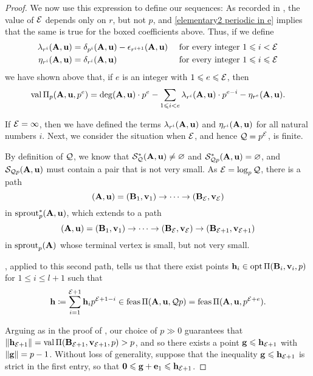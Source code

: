 \documentclass{article}
\begin{document}
\begin{proof}
   We now use this expression to define our sequences:  As recorded in , the value of $\mathcal{E}$ depends only on $r$, but not $p$, and \eqref{elementary2 periodic in e} implies that the same is true for the boxed coefficients above.  Thus, if we define 
   \begin{align*}
   \lambda_{r^i}(\mathbf{A}, \mathbf{u}) & = \delta_{p^i}(\mathbf{A}, \mathbf{u}) - \epsilon_{r^{i+1}}(\mathbf{A}, \mathbf{u}) & \text{ for every integer } 1 \leqslant i  < \mathcal{E} \\ 
   \eta_{r^i}(\mathbf{A}, \mathbf{u}) & = \delta_{r^i}(\mathbf{A}, \mathbf{u}) & \text{ for every integer } 1 \leqslant i \leqslant \mathcal{E}
  \end{align*}   
   we have shown above that, if $e$ is an integer with $1 \leqslant e \leqslant \mathcal{E}$, then
   \begin{equation}
   \label{val-up-to-curly-e-via-two-sequences: e}
   \operatorname{val} \Pi_p(\mathbf{A},\mathbf{u},p^e) = \operatorname{deg}(\mathbf{A}, \mathbf{u}) \cdot p^e - \sum_{1 \leqslant i < e} \lambda_{r^i}(\mathbf{A}, \mathbf{u}) \cdot p^{e-i} - {\eta_{r^e}(\mathbf{A}, \mathbf{u})}.
   \end{equation}
   
   If $\mathcal{E} = \infty$, then we have defined the terms $\lambda_{r^i}(\mathbf{A}, \mathbf{u})$ and $\eta_{r^i}(\mathbf{A}, \mathbf{u})$ for all natural numbers $i$. Next, we consider the situation when $\mathcal{E}$, and hence $\mathcal{Q} = p^{\mathcal{E}}$, is finite.
   
   By definition of $\mathcal{Q}$, we know that $\mathcal{S}_{\mathcal{Q}}^{\ast}(\mathbf{A},\mathbf{u}) \neq \varnothing$ and $\mathcal{S}^{\ast}_{\mathcal{Q} p}(\mathbf{A},\mathbf{u}) = \varnothing$, and $\mathcal{S}_{\mathcal{Q} p}(\mathbf{A},\mathbf{u})$ must contain a pair that is not very small.  As $\mathcal{E} = \log_p \mathcal{Q}$, there is a path
   \begin{equation}\label{eq: first path}
      (\mathbf{A},\mathbf{u}) = (\mathbf{B}_1,\mathbf{v}_1) \to \cdots \to (\mathbf{B}_{\mathcal{E}}, \mathbf{v}_{\mathcal{E}})
   \end{equation}
   in $\operatorname{sprout}_p^{\ast}(\mathbf{A},\mathbf{u})$, which extends to a path
   \[
      (\mathbf{A},\mathbf{u}) = (\mathbf{B}_1,\mathbf{v}_1) \to \cdots \to (\mathbf{B}_{\mathcal{E}}, \mathbf{v}_{\mathcal{E}}) \to (\mathbf{B}_{\mathcal{E}+1}, \mathbf{v}_{\mathcal{E}+1})
   \]
   in $\operatorname{sprout}_p(\mathbf{A})$ whose terminal vertex is small, but not very small.
   
   , applied to this second path, tells us that there exist points $\mathbf{h}_i \in \operatorname{opt} \Pi(\mathbf{B}_i, \mathbf{v}_i, p)$ for $1\le i\le l+1$ such that
   \[
      \mathbf{h} \coloneqq \sum_{i=1}^{\mathcal{E}+1} \mathbf{h}_i p^{\mathcal{E}+1-i} \in \operatorname{feas} \Pi(\mathbf{A},\mathbf{u}, \mathcal{Q} p) = \operatorname{feas} \Pi(\mathbf{A},\mathbf{u}, p^{\mathcal{E}+e}).
   \] 
   
   Arguing as in the proof of , our choice of $p \gg 0$ guarantees that $\| \mathbf{h}_{\mathcal{E}+1} \| = \operatorname{val}\Pi(\mathbf{B}_{\mathcal{E}+1}, \mathbf{v}_{\mathcal{E}+1},p) > p$, and so there exists a point $\mathbf{g} \leqslant \mathbf{h}_{\mathcal{E}+1}$ with $\| \mathbf{g} \| = p-1$.
   Without loss of generality, suppose that the inequality $\mathbf{g} \leqslant \mathbf{h}_{\mathcal{E}+1}$ is strict in the first entry, so that $\mathbf{0} \leqslant \mathbf{g} + \mathbf{e}_1 \leqslant \mathbf{h}_{\mathcal{E}+1}$.


\end{proof}
\end{document}
